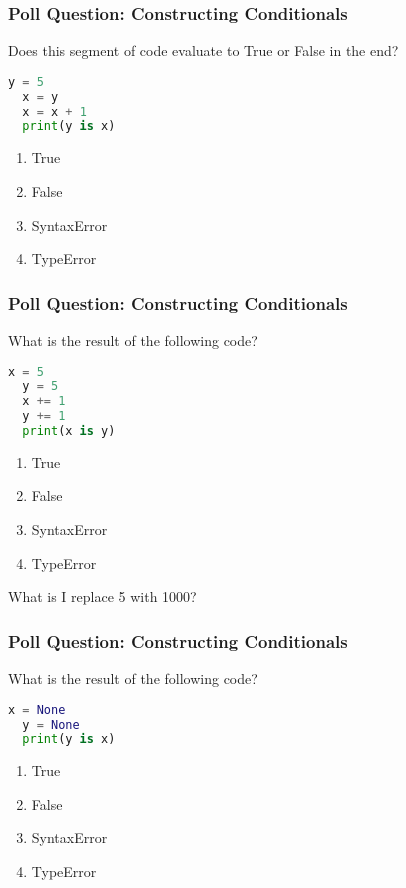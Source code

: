\documentclass{beamer}
\begin{document}
%
%
\begin{frame}[fragile]
	\frametitle{Poll Question: Constructing Conditionals}
  Does this segment of code evaluate to True or False in the end?
  \begin{lstlisting}[language=Python, autogobble,basicstyle=\tiny,numbers=none]
  y = 5
  x = y
  x = x + 1
  print(y is x)
  \end{lstlisting}
  \vfill
  \begin{enumerate}[A]
    \item True
    \item False
    \item SyntaxError
    \item TypeError
  \end{enumerate}
\end{frame}

%
%
\begin{frame}[fragile]
	\frametitle{Poll Question: Constructing Conditionals}
  What is the result of the following code?
  \begin{lstlisting}[language=Python, autogobble,basicstyle=\tiny,numbers=none]
  x = 5
  y = 5
  x += 1
  y += 1
  print(x is y)
  \end{lstlisting}
  \vfill
  \begin{enumerate}[A]
    \item True
    \item False
    \item SyntaxError
    \item TypeError
  \end{enumerate}
  \pause
  What is I replace 5 with 1000?
\end{frame}

%
%
\begin{frame}[fragile]
	\frametitle{Poll Question: Constructing Conditionals}
  What is the result of the following code?
  \begin{lstlisting}[language=Python, autogobble,basicstyle=\tiny,numbers=none]
  x = None
  y = None
  print(y is x)
  \end{lstlisting}
  \vfill
  \begin{enumerate}[A]
    \item True
    \item False
    \item SyntaxError
    \item TypeError
  \end{enumerate}
\end{frame}
\end{document}

